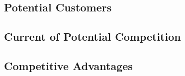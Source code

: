 
\subsection{Potential Customers}
\subsection{Current of Potential Competition}
\subsection{Competitive Advantages}
